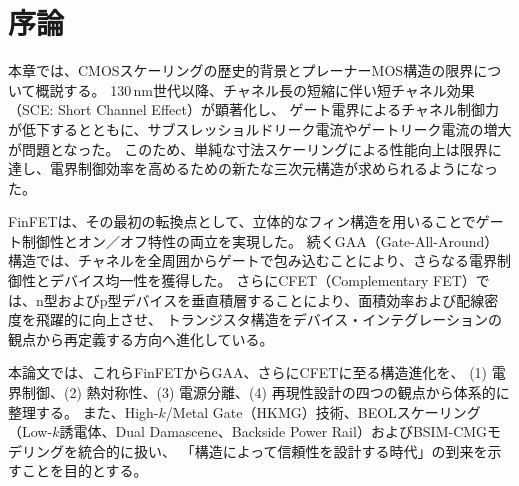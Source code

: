 \section{序論}
本章では、CMOSスケーリングの歴史的背景とプレーナーMOS構造の限界について概説する。  
130\,nm世代以降、チャネル長の短縮に伴い短チャネル効果（SCE: Short Channel Effect）が顕著化し、  
ゲート電界によるチャネル制御力が低下するとともに、サブスレッショルドリーク電流やゲートリーク電流の増大が問題となった。  
このため、単純な寸法スケーリングによる性能向上は限界に達し、電界制御効率を高めるための新たな三次元構造が求められるようになった。

FinFETは、その最初の転換点として、立体的なフィン構造を用いることでゲート制御性とオン／オフ特性の両立を実現した。  
続くGAA（Gate-All-Around）構造では、チャネルを全周囲からゲートで包み込むことにより、さらなる電界制御性とデバイス均一性を獲得した。  
さらにCFET（Complementary FET）では、n型およびp型デバイスを垂直積層することにより、面積効率および配線密度を飛躍的に向上させ、  
トランジスタ構造をデバイス・インテグレーションの観点から再定義する方向へ進化している。

本論文では、これらFinFETからGAA、さらにCFETに至る構造進化を、  
(1) 電界制御、(2) 熱対称性、(3) 電源分離、(4) 再現性設計の四つの観点から体系的に整理する。  
また、High-$k$/Metal Gate（HKMG）技術、BEOLスケーリング（Low-$k$誘電体、Dual Damascene、Backside Power Rail）およびBSIM-CMGモデリングを統合的に扱い、  
「構造によって信頼性を設計する時代」の到来を示すことを目的とする。
